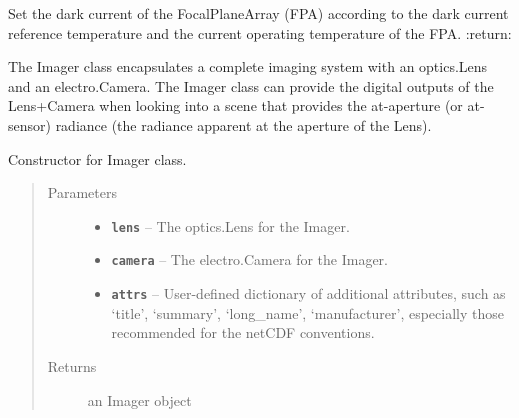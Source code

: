 \documentclass[a4paper,10pt,english]{sphinxmanual}
\begin{document}
\begin{fulllineitems}

\begin{fulllineitems}
\label{packages:electro.FocalPlaneArray.set_dark_current}
Set the dark current of the FocalPlaneArray (FPA) according to the dark current reference temperature and
the current operating temperature of the FPA.
:return:

\end{fulllineitems}


\end{fulllineitems}


\begin{fulllineitems}
\label{packages:electro.Imager}
The Imager class encapsulates a complete imaging system with an optics.Lens and an electro.Camera.
The Imager class can provide the digital outputs of the Lens+Camera when looking into a scene that provides the
at-aperture (or at-sensor) radiance (the radiance apparent at the aperture of the Lens).

Constructor for Imager class.
\begin{quote}\begin{description}
\item[{Parameters}] \leavevmode\begin{itemize}
\item {} 
\textbf{\texttt{lens}} -- The optics.Lens for the Imager.

\item {} 
\textbf{\texttt{camera}} -- The electro.Camera for the Imager.

\item {} 
\textbf{\texttt{attrs}} -- User-defined dictionary of additional attributes, such as `title', `summary', `long\_name',
`manufacturer', especially those recommended for the netCDF conventions.

\end{itemize}

\item[{Returns}] \leavevmode
an Imager object

\end{description}\end{quote}


\end{fulllineitems}
\end{document}
